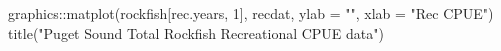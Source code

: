 \begin{Schunk}
\begin{Sinput}
 graphics::matplot(rockfish[rec.years, 1], recdat, ylab = "", xlab = "Rec CPUE")
 title("Puget Sound Total Rockfish Recreational CPUE data")
\end{Sinput}
\end{Schunk}
